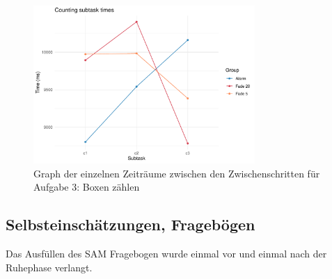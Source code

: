 \begin{figure}[H]
	\centering
	\includegraphics[width=0.75\textwidth]{./_StudyResults/timeTask3}
	\caption{Graph der einzelnen Zeiträume zwischen den Zwischenschritten für Aufgabe 3: Boxen zählen}
	\label{fig:timeTask3}
\end{figure}


\subsection{Selbsteinschätzungen, Fragebögen}


Das Ausfüllen des SAM Fragebogen wurde einmal vor und einmal nach der Ruhephase verlangt. 

